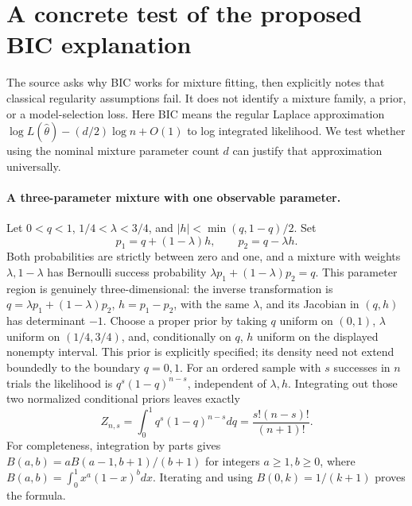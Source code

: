 \documentclass[11pt]{article}
\begin{document}
\section{A concrete test of the proposed BIC explanation}
The source asks why BIC works for mixture fitting, then explicitly notes
that classical regularity assumptions fail. It does not identify a
mixture family, a prior, or a model-selection loss. Here BIC means the
regular Laplace approximation $\log L(\widehat\theta)-(d/2)\log n+O(1)$
to log integrated likelihood. We test whether using the nominal mixture
parameter count $d$ can justify that approximation universally.

\paragraph{A three-parameter mixture with one observable parameter.}
Let $0<q<1$, $1/4<\lambda<3/4$, and
$|h|<\min(q,1-q)/2$. Set
\[
p_1=q+(1-\lambda)h,\qquad p_2=q-\lambda h.
\]
Both probabilities are strictly between zero and one, and a mixture
with weights $\lambda,1-\lambda$ has Bernoulli success probability
$\lambda p_1+(1-\lambda)p_2=q$. This parameter region is genuinely
three-dimensional: the inverse transformation is
$q=\lambda p_1+(1-\lambda)p_2$, $h=p_1-p_2$, with the same $\lambda$,
and its Jacobian in $(q,h)$ has determinant $-1$.
Choose a proper prior by taking $q$ uniform on $(0,1)$, $\lambda$
uniform on $(1/4,3/4)$, and, conditionally on $q$, $h$ uniform on
the displayed nonempty interval. This prior is explicitly specified;
its density need not extend boundedly to the boundary $q=0,1$.
For an ordered sample with $s$ successes in $n$ trials the likelihood
is $q^s(1-q)^{n-s}$, independent of $\lambda,h$. Integrating out those
two normalized conditional priors leaves exactly
\[
 Z_{n,s}=\int_0^1q^s(1-q)^{n-s}dq
          =\frac{s!(n-s)!}{(n+1)!}.
\]
For completeness, integration by parts gives
$B(a,b)=aB(a-1,b+1)/(b+1)$ for integers $a\ge1,b\ge0$,
where $B(a,b)=\int_0^1x^a(1-x)^b dx$.
Iterating and using $B(0,k)=1/(k+1)$ proves the formula.
\end{document}
